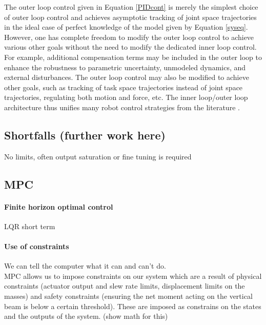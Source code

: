 \documentclass{UoNMCHA}
\numberwithin{equation}{section}
\begin{document}
	\newpage
	
	The outer loop control given in Equation \ref{PIDcont} is merely the simplest choice of outer loop control and achieves asymptotic tracking of joint space trajectories in the ideal case of perfect knowledge of the model given by Equation \ref{syseq}. However, one has complete freedom to modify the outer loop control to achieve various other goals without the need to modify the dedicated inner loop control. For example, additional compensation terms may be included in the outer loop to enhance the robustness to parametric uncertainty, unmodeled dynamics, and external disturbances. The outer loop control may also be modified to achieve other goals, such as tracking of task space trajectories instead of joint space trajectories, regulating both motion and force, etc. The inner loop/outer loop architecture thus unifies many robot control strategies from the literature \cite{levine_1996_the}.
	
	
	\subsection*{Shortfalls (further work here)}
	
	No limits, often output saturation or fine tuning is required
	
	\subsection{MPC}
	
	\paragraph*{Finite horizon optimal control}
	LQR short term
	
	\paragraph*{Use of constraints}
	
	We can tell the computer what it can and can’t do.  \\
	
	MPC allows us to impose constraints on our system which are a result of physical constraints (actuator output and slew rate limits, displacement limits on the masses) and safety constraints (ensuring the net moment acting on the vertical beam is below a certain threshold). These are imposed as constrains on the states and the outputs of the system. (show math for this) 
	
\end{document}
